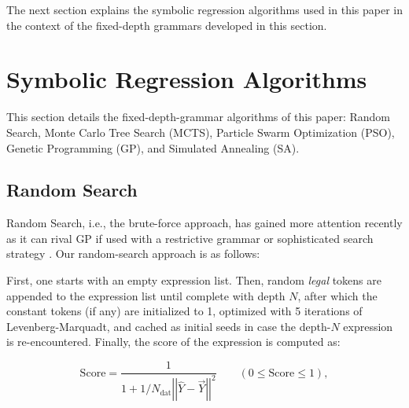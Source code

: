 \documentclass[runningheads]{llncs}
\begin{document}

    

The next section explains the symbolic regression algorithms used in this paper in the context of the fixed-depth grammars developed in this section.

\section{Symbolic Regression Algorithms}\label{sec:SymbolicRegressionAlgorithms}

This section details the fixed-depth-grammar algorithms of this paper: Random Search, Monte Carlo Tree Search (MCTS), Particle Swarm Optimization (PSO), Genetic Programming (GP), and Simulated Annealing (SA).

\subsection{Random Search}\label{subsec:RandomSearch}

Random Search, i.e., the brute-force approach, has gained more attention recently \cite{Heule2017TheSO} as it can rival GP if used with a restrictive grammar \cite{Kammerer2020} or sophisticated search strategy \cite{udrescu2020ai}.
Our random-search approach is as follows:
\par First, one starts with an empty expression list. Then, random \emph{legal} tokens are appended to the expression list until complete with depth $N$, after which the constant tokens (if any) are initialized to 1, optimized with 5 iterations of Levenberg-Marquadt, and cached as initial seeds in case the depth-$N$ expression is re-encountered. Finally, the score of the expression is computed as:

\begin{equation}
\mathrm{Score} = \frac{1}{1+ 1/N_{\mathrm{dat}}\left|\left|\hat{Y}-\vec{Y}\right|\right|^2} \qquad  (0 \leq \mathrm{Score} \leq 1), \label{eq:score_formula}
\end{equation}
\end{document}
